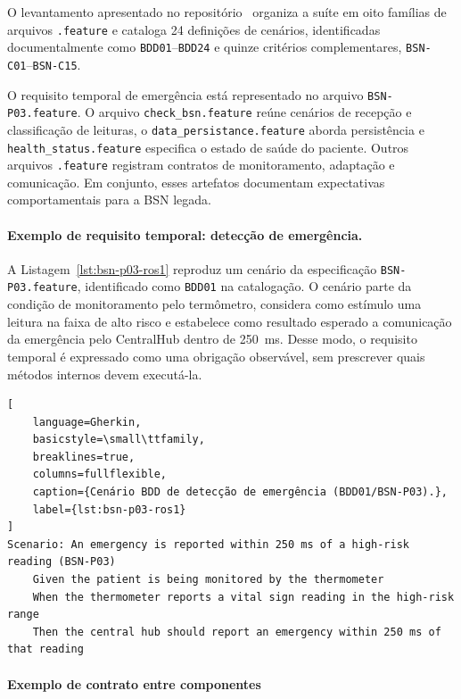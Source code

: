 O levantamento apresentado no repositório~\cite{Viana} organiza a suíte em oito famílias de arquivos \texttt{.feature} e cataloga 24 definições de cenários, identificadas documentalmente como \texttt{BDD01}--\texttt{BDD24} e quinze critérios complementares, \texttt{BSN-C01}--\texttt{BSN-C15}.

O requisito temporal de emergência está representado no arquivo \texttt{BSN-\allowbreak P03.feature}. O arquivo \texttt{check\_\allowbreak bsn.feature} reúne cenários de recepção e classificação de leituras, o \texttt{data\_\allowbreak persistance.feature} aborda persistência e \texttt{health\_\allowbreak status.feature} especifica o estado de saúde do paciente. Outros arquivos \texttt{.feature} registram contratos de monitoramento, adaptação e comunicação. Em conjunto, esses artefatos documentam expectativas comportamentais para a BSN legada.

\paragraph{Exemplo de requisito temporal: detecção de emergência.}

A Listagem~\ref{lst:bsn-p03-ros1} reproduz um cenário da especificação \texttt{BSN-P03.feature}, identificado como \texttt{BDD01} na catalogação. O cenário parte da condição de monitoramento pelo termômetro, considera como estímulo uma leitura na faixa de alto risco e estabelece como resultado esperado a comunicação da emergência pelo CentralHub dentro de 250~ms. Desse modo, o requisito temporal é expressado como uma obrigação observável, sem prescrever quais métodos internos devem executá-la.

\begin{lstlisting}[
    language=Gherkin,
    basicstyle=\small\ttfamily,
    breaklines=true,
    columns=fullflexible,
    caption={Cenário BDD de detecção de emergência (BDD01/BSN-P03).},
    label={lst:bsn-p03-ros1}
]
Scenario: An emergency is reported within 250 ms of a high-risk reading (BSN-P03)
    Given the patient is being monitored by the thermometer
    When the thermometer reports a vital sign reading in the high-risk range
    Then the central hub should report an emergency within 250 ms of that reading
\end{lstlisting}

\paragraph{Exemplo de contrato entre componentes}

